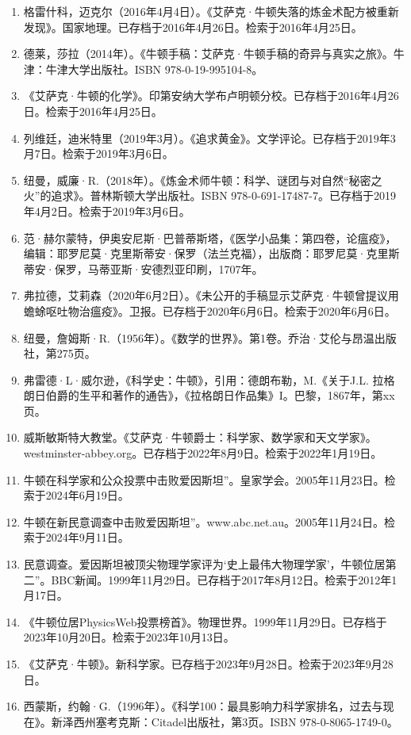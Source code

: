 \begin{enumerate}
\item 格雷什科，迈克尔（2016年4月4日）。《艾萨克·牛顿失落的炼金术配方被重新发现》。国家地理。已存档于2016年4月26日。检索于2016年4月25日。  
\item 德莱，莎拉（2014年）。《牛顿手稿：艾萨克·牛顿手稿的奇异与真实之旅》。牛津：牛津大学出版社。ISBN 978-0-19-995104-8。  
\item 《艾萨克·牛顿的化学》。印第安纳大学布卢明顿分校。已存档于2016年4月26日。检索于2016年4月25日。  
\item 列维廷，迪米特里（2019年3月）。《追求黄金》。文学评论。已存档于2019年3月7日。检索于2019年3月6日。
\item 纽曼，威廉·R.（2018年）。《炼金术师牛顿：科学、谜团与对自然“秘密之火”的追求》。普林斯顿大学出版社。ISBN 978-0-691-17487-7。已存档于2019年4月2日。检索于2019年3月6日。  
\item 范·赫尔蒙特，伊奥安尼斯·巴普蒂斯塔，《医学小品集：第四卷，论瘟疫》，编辑：耶罗尼莫·克里斯蒂安·保罗（法兰克福），出版商：耶罗尼莫·克里斯蒂安·保罗，马蒂亚斯·安德烈亚印刷，1707年。  
\item 弗拉德，艾莉森（2020年6月2日）。《未公开的手稿显示艾萨克·牛顿曾提议用蟾蜍呕吐物治瘟疫》。卫报。已存档于2020年6月6日。检索于2020年6月6日。  
\item 纽曼，詹姆斯·R.（1956年）。《数学的世界》。第1卷。乔治·艾伦与昂温出版社，第275页。
\item 弗雷德·L·威尔逊，《科学史：牛顿》，引用：德朗布勒，M.《关于J.L. 拉格朗日伯爵的生平和著作的通告》，《拉格朗日作品集》I。巴黎，1867年，第xx页。  
\item 威斯敏斯特大教堂。《艾萨克·牛顿爵士：科学家、数学家和天文学家》。westminster-abbey.org。已存档于2022年8月9日。检索于2022年1月19日。  
\item 牛顿在科学家和公众投票中击败爱因斯坦”。皇家学会。2005年11月23日。检索于2024年6月19日。  
\item 牛顿在新民意调查中击败爱因斯坦”。www.abc.net.au。2005年11月24日。检索于2024年9月11日。  
\item 民意调查。爱因斯坦被顶尖物理学家评为‘史上最伟大物理学家’，牛顿位居第二”。BBC新闻。1999年11月29日。已存档于2017年8月12日。检索于2012年1月17日。
\item 《牛顿位居PhysicsWeb投票榜首》。物理世界。1999年11月29日。已存档于2023年10月20日。检索于2023年10月13日。  
\item 《艾萨克·牛顿》。新科学家。已存档于2023年9月28日。检索于2023年9月28日。  
\item 西蒙斯，约翰·G.（1996年）。《科学100：最具影响力科学家排名，过去与现在》。新泽西州塞考克斯：Citadel出版社，第3页。ISBN 978-0-8065-1749-0。  

\end{enumerate}
